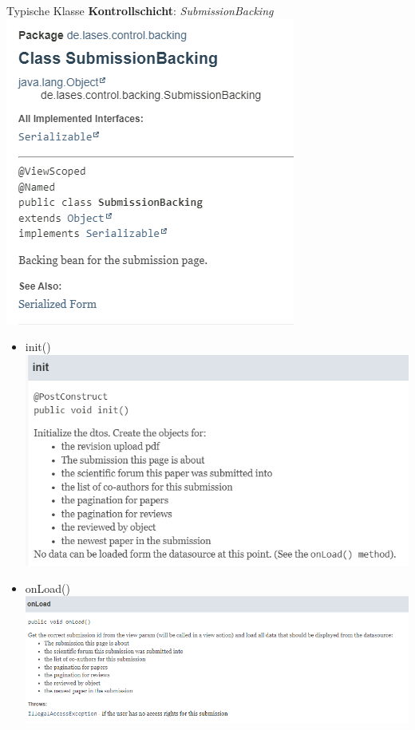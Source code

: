 \documentclass{beamer}
\begin{document}
    \begin{frame}{Typische Klasse \textbf{Kontrollschicht}:}
        \emph{SubmissionBacking}
        \centering
        \includegraphics[height=1.1\textheight]{graphics/backing/doc_backing}
        \pause
        \begin{itemize}
            \item init()
            \centering
            \includegraphics[height=1.1\textheight]{graphics/backing/doc_init}

            \item onLoad()
            \centering
            \includegraphics[height=1.1\textheight]{graphics/backing/doc_onLoad}



\end{itemize}
\end{frame}
\end{document}
